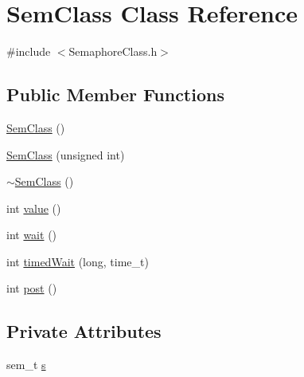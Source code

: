 \hypertarget{classSemClass}{\section{\-Sem\-Class \-Class \-Reference}
\label{classSemClass}
}


{\ttfamily \#include $<$\-Semaphore\-Class.\-h$>$}

\subsection*{\-Public \-Member \-Functions}
\begin{DoxyCompactItemize}
\item 
\hyperlink{classSemClass_a6704a908c6163db62f866a809ee75501}{\-Sem\-Class} ()
\item 
\hyperlink{classSemClass_a36c797b19db63037b1ad8cdcac7b85b9}{\-Sem\-Class} (unsigned int)
\item 
\hyperlink{classSemClass_a925f2f420bc62d2e5458bad046fe77ce}{$\sim$\-Sem\-Class} ()
\item 
int \hyperlink{classSemClass_a8cae9e0d23481e4dca0782045ddced00}{value} ()
\item 
int \hyperlink{classSemClass_a12aaec99fbdb8ee0879c0f99e9f71155}{wait} ()
\item 
int \hyperlink{classSemClass_a04dcd521fc7f21b93f9e07762c1010e8}{timed\-Wait} (long, time\-\_\-t)
\item 
int \hyperlink{classSemClass_a1a1a3dd0b9d3d364371036509454a24e}{post} ()
\end{DoxyCompactItemize}
\subsection*{\-Private \-Attributes}
\begin{DoxyCompactItemize}
\item 
sem\-\_\-t \hyperlink{classSemClass_a03e8d1cad1b13ab754352443cfe09d48}{s}
\end{DoxyCompactItemize}



